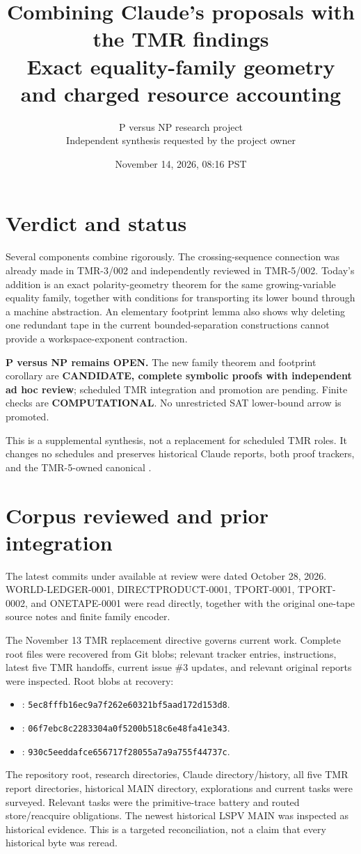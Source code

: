 \documentclass[11pt]{article}
\title{Combining Claude's proposals with the TMR findings\\
\large Exact equality-family geometry and charged resource accounting}
\author{P versus NP research project\\Independent synthesis requested by the project owner}
\date{November 14, 2026, 08:16 PST}
\begin{document}
\maketitle

\section{Verdict and status}
Several components combine rigorously. The crossing-sequence connection was already made in TMR-3/002 and independently reviewed in TMR-5/002. Today's addition is an exact polarity-geometry theorem for the same growing-variable equality family, together with conditions for transporting its lower bound through a machine abstraction. An elementary footprint lemma also shows why deleting one redundant tape in the current bounded-separation constructions cannot provide a workspace-exponent contraction.

\textbf{P versus NP remains OPEN.} The new family theorem and footprint corollary are \textbf{CANDIDATE, complete symbolic proofs with independent ad hoc review}; scheduled TMR integration and promotion are pending. Finite checks are \textbf{COMPUTATIONAL}. No unrestricted SAT lower-bound arrow is promoted.

This is a supplemental synthesis, not a replacement for scheduled TMR roles. It changes no schedules and preserves historical Claude reports, both proof trackers, and the TMR-5-owned canonical .

\section{Corpus reviewed and prior integration}
The latest commits under  available at review were dated October 28, 2026. WORLD-LEDGER-0001, DIRECTPRODUCT-0001, TPORT-0001, TPORT-0002, and ONETAPE-0001 were read directly, together with the original one-tape source notes and finite family encoder.

The November 13 TMR replacement directive governs current work. Complete root files were recovered from Git blobs; relevant tracker entries, instructions, latest five TMR handoffs, current issue \#3 updates, and relevant original reports were inspected. Root blobs at recovery:
\begin{itemize}
\item[] : \texttt{5ec8fffb16ec9a7f262e60321bf5aad172d153d8}.
\item[] : \texttt{06f7ebc8c2283304a0f5200b518c6e48fa41e343}.
\item[] : \texttt{930c5eeddafce656717f28055a7a9a755f44737c}.
\end{itemize}
The repository root, research directories, Claude directory/history, all five TMR report directories, historical MAIN directory, explorations and current tasks were surveyed. Relevant tasks were the primitive-trace battery and routed store/reacquire obligations. The newest historical LSPV MAIN was inspected as historical evidence. This is a targeted reconciliation, not a claim that every historical byte was reread.
\end{document}
